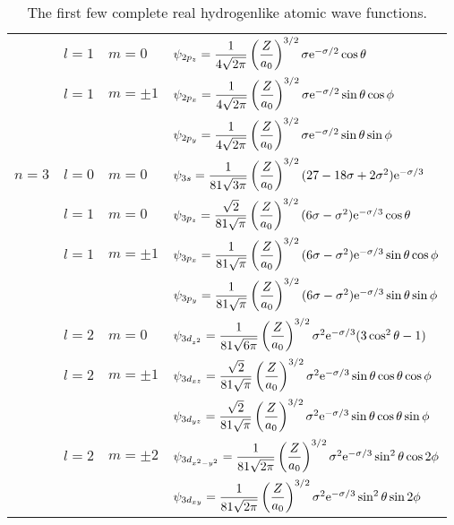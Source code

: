 \documentclass[../notes.tex]{subfiles}
\begin{document}
\begin{itemize}
\begin{table}[h!]
\begin{tabular}{llll}
                  & $l=1$ & $m=0$ & $\psi_{2p_z}=\dfrac{1}{4\sqrt{2\pi}}\left( \dfrac{Z}{a_0} \right)^{3/2}\sigma\e[-\sigma/2]\cos\theta$\\
                  & $l=1$ & $m=\pm 1$ & $\psi_{2p_x}=\dfrac{1}{4\sqrt{2\pi}}\left( \dfrac{Z}{a_0} \right)^{3/2}\sigma\e[-\sigma/2]\sin\theta\cos\phi$\\
                  &       &           & $\psi_{2p_y}=\dfrac{1}{4\sqrt{2\pi}}\left( \dfrac{Z}{a_0} \right)^{3/2}\sigma\e[-\sigma/2]\sin\theta\sin\phi$\\
            $n=3$ & $l=0$ & $m=0$ & $\psi_{3s}=\dfrac{1}{81\sqrt{3\pi}}\left( \dfrac{Z}{a_0} \right)^{3/2}(27-18\sigma+2\sigma^2)\e[-\sigma/3]$\\
                  & $l=1$ & $m=0$ & $\psi_{3p_z}=\dfrac{\sqrt{2}}{81\sqrt{\pi}}\left( \dfrac{Z}{a_0} \right)^{3/2}(6\sigma-\sigma^2)\e[-\sigma/3]\cos\theta$\\
                  & $l=1$ & $m=\pm 1$ & $\psi_{3p_x}=\dfrac{1}{81\sqrt{\pi}}\left( \dfrac{Z}{a_0} \right)^{3/2}(6\sigma-\sigma^2)\e[-\sigma/3]\sin\theta\cos\phi$\\
                  &       &           & $\psi_{3p_y}=\dfrac{1}{81\sqrt{\pi}}\left( \dfrac{Z}{a_0} \right)^{3/2}(6\sigma-\sigma^2)\e[-\sigma/3]\sin\theta\sin\phi$\\
                  & $l=2$ & $m=0$ & $\psi_{3d_{z^2}}=\dfrac{1}{81\sqrt{6\pi}}\left( \dfrac{Z}{a_0} \right)^{3/2}\sigma^2\e[-\sigma/3](3\cos^2\theta-1)$\\
                  & $l=2$ & $m=\pm 1$ & $\psi_{3d_{xz}}=\dfrac{\sqrt{2}}{81\sqrt{\pi}}\left( \dfrac{Z}{a_0} \right)^{3/2}\sigma^2\e[-\sigma/3]\sin\theta\cos\theta\cos\phi$\\
                  &       &           & $\psi_{3d_{yz}}=\dfrac{\sqrt{2}}{81\sqrt{\pi}}\left( \dfrac{Z}{a_0} \right)^{3/2}\sigma^2\e[-\sigma/3]\sin\theta\cos\theta\sin\phi$\\
                  & $l=2$ & $m=\pm 2$ & $\psi_{3d_{x^2-y^2}}=\dfrac{1}{81\sqrt{2\pi}}\left( \dfrac{Z}{a_0} \right)^{3/2}\sigma^2\e[-\sigma/3]\sin^2\theta\cos 2\phi$\\
                  &       &           & $\psi_{3d_{xy}}=\dfrac{1}{81\sqrt{2\pi}}\left( \dfrac{Z}{a_0} \right)^{3/2}\sigma^2\e[-\sigma/3]\sin^2\theta\sin 2\phi$\\
            \bottomrule
        \end{tabular}
        \caption{The first few complete real hydrogenlike atomic wave functions.}
        \label{tab:hydrogenRealWavefunctions}

\end{table}
\end{itemize}
\end{document}
